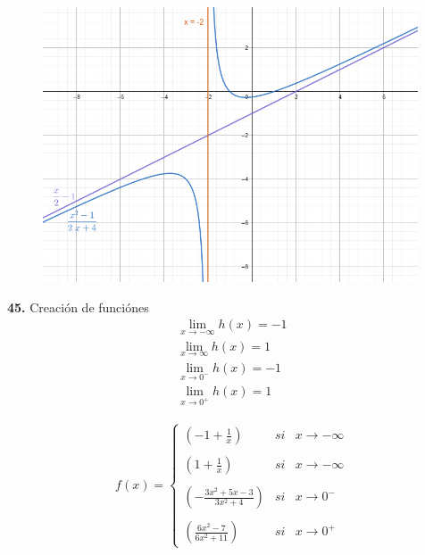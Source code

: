 \documentclass[12pt, letterpaper]{article}
\begin{document}
\begin{figure}[tbh]
\centering
\includegraphics[width=30em]{t12tres}
\end{figure}
\newpage
\textbf{45.} Creación de funciónes\\

\begin{align*}
	\lim_{x \to -\infty} h(x) = -1  \\ 
	\lim_{x \to \infty} h(x) = 1  \\ 
	\lim_{x \to 0^-} h(x) = -1  \\ 
	\lim_{x \to 0^+} h(x) = 1  
\end{align*}


\begin{align*}
f(x)= \left\{ \begin{array}{lcc}
                 (-1 + \frac{1}{x}) &   si  & x \to -\infty \\
	  	\\ (1 + \frac{1}{x}) &   si  & x \to -\infty \\
		\\ (-\frac{3x^2+5x-3}{3x^2+4}) &   si  & x \to 0^- \\
             	\\ (\frac{6x^2-7}{6x^2+11}) &   si  & x \to 0^+
             \end{array}
   \right.
\end{align*}
\end{document}
